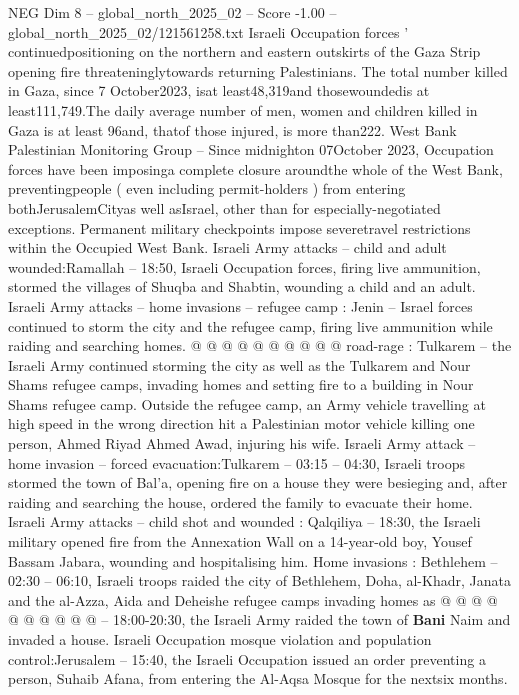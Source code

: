 \begin{textsample}{NEG Dim 8 – global\_north\_2025\_02 – Score -1.00 – global\_north\_2025\_02/121561258.txt}  \label{ex:f8_neg_149}
Israeli Occupation forces ' continuedpositioning on the northern and eastern outskirts of the Gaza Strip opening fire threateninglytowards returning Palestinians.
The total number killed in Gaza, since 7 October2023, isat least48,319and thosewoundedis at least111,749.The daily average number of men, women and children killed in Gaza is at least 96and, thatof those injured, is more than222.
West Bank Palestinian Monitoring Group -- Since midnighton 07October 2023, Occupation forces have been imposinga complete closure aroundthe whole of the West Bank, preventingpeople ( even including permit-holders ) from entering bothJerusalemCityas well asIsrael, other than for especially-negotiated exceptions.
Permanent military checkpoints impose severetravel restrictions within the Occupied West Bank.
Israeli Army attacks -- child and adult wounded:Ramallah -- 18:50, Israeli Occupation forces, firing live ammunition, stormed the villages of Shuqba and Shabtin, wounding a child and an adult.
Israeli Army attacks -- home invasions -- refugee camp : Jenin -- Israel forces continued to storm the city and the refugee camp, firing live ammunition while raiding and searching homes. @ @ @ @ @ @ @ @ @ @ road-rage : Tulkarem -- the Israeli Army continued storming the city as well as the Tulkarem and Nour Shams refugee camps, invading homes and setting fire to a building in Nour Shams refugee camp.
Outside the refugee camp, an Army vehicle travelling at high speed in the wrong direction hit a Palestinian motor vehicle killing one person, Ahmed Riyad Ahmed Awad, injuring his wife.
Israeli Army attack -- home invasion -- forced evacuation:Tulkarem -- 03:15 -- 04:30, Israeli troops stormed the town of Bal'a, opening fire on a house they were besieging and, after raiding and searching the house, ordered the family to evacuate their home.
Israeli Army attacks -- child shot and wounded : Qalqiliya -- 18:30, the Israeli military opened fire from the Annexation Wall on a 14-year-old boy, Yousef Bassam Jabara, wounding and hospitalising him.
Home invasions : Bethlehem -- 02:30 -- 06:10, Israeli troops raided the city of Bethlehem, Doha, al-Khadr, Janata and the al-Azza, Aida and Deheishe refugee camps invading homes as @ @ @ @ @ @ @ @ @ @ -- 18:00-20:30, the Israeli Army raided the town of \textbf{Bani} Naim and invaded a house.
Israeli Occupation mosque violation and population control:Jerusalem -- 15:40, the Israeli Occupation issued an order preventing a person, Suhaib Afana, from entering the Al-Aqsa Mosque for the nextsix months.

\end{textsample}
